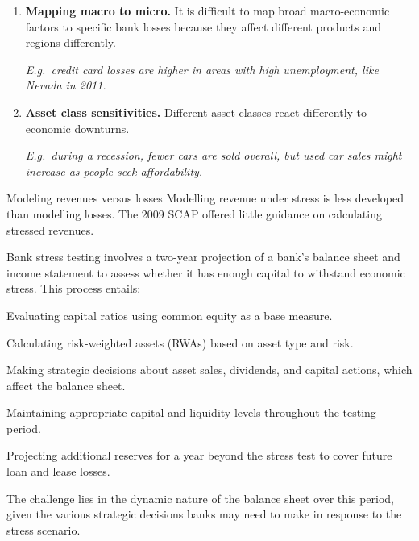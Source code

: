 \begin{enumerate}
\item[\textcolor{rust}{\sffamily\bfseries 1.}] \textbf{Mapping macro to micro.}
It is difficult to map broad macro-economic factors to specific bank losses
because they affect different products and regions differently.\par
{\fontsize{9}{11}\selectfont\color{rust}\itshape E.g.\ credit card losses are
higher in areas with high unemployment, like Nevada in 2011.}
\item[\textcolor{rust}{\sffamily\bfseries 2.}] \textbf{Asset class
sensitivities.} Different asset classes react differently to economic
downturns.\par
{\fontsize{9}{11}\selectfont\color{rust}\itshape E.g.\ during a recession, fewer
cars are sold overall, but used car sales might increase as people seek
affordability.}
\end{enumerate}

\begin{ornotebox}{Modeling revenues versus losses}
Modelling revenue under stress is less developed than modelling losses. The 2009
SCAP offered little guidance on calculating stressed revenues.
\end{ornotebox}


Bank stress testing involves a two-year projection of a bank's balance sheet and
income statement to assess whether it has enough capital to withstand economic
stress. This process entails:

\begin{checks}
\item Evaluating capital ratios using common equity as a base measure.
\item Calculating risk-weighted assets (RWAs) based on asset type and risk.
\item Making strategic decisions about asset sales, dividends, and capital
actions, which affect the balance sheet.
\item Maintaining appropriate capital and liquidity levels throughout the testing
period.
\item Projecting additional reserves for a year beyond the stress test to cover
future loan and lease losses.
\end{checks}

The challenge lies in the dynamic nature of the balance sheet over this period,
given the various strategic decisions banks may need to make in response to the
stress scenario.

